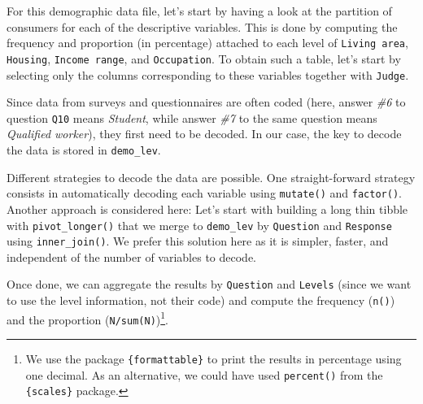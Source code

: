 \documentclass[
]{krantz}
\begin{document}
For this demographic data file, let's start by having a look at the partition of consumers for each of the descriptive variables. This is done by computing the frequency and proportion (in percentage) attached to each level of \texttt{Living\ area}, \texttt{Housing}, \texttt{Income\ range}, and \texttt{Occupation}. To obtain such a table, let's start by selecting only the columns corresponding to these variables together with \texttt{Judge}.

Since data from surveys and questionnaires are often coded (here, answer \emph{\#6} to question \texttt{Q10} means \emph{Student}, while answer \emph{\#7} to the same question means \emph{Qualified worker}), they first need to be decoded. In our case, the key to decode the data is stored in \texttt{demo\_lev}.

Different strategies to decode the data are possible. One straight-forward strategy consists in automatically decoding each variable using \texttt{mutate()} and \texttt{factor()}. Another approach is considered here: Let's start with building a long thin tibble with \texttt{pivot\_longer()} that we merge to \texttt{demo\_lev} by \texttt{Question} and \texttt{Response} using \texttt{inner\_join()}. We prefer this solution here as it is simpler, faster, and independent of the number of variables to decode.

Once done, we can aggregate the results by \texttt{Question} and \texttt{Levels} (since we want to use the level information, not their code) and compute the frequency (\texttt{n()}) and the proportion (\texttt{N/sum(N)})\footnote{We use the package \texttt{\{formattable\}} to print the results in percentage using one decimal. As an alternative, we could have used \texttt{percent()} from the \texttt{\{scales\}} package.}.
\end{document}
